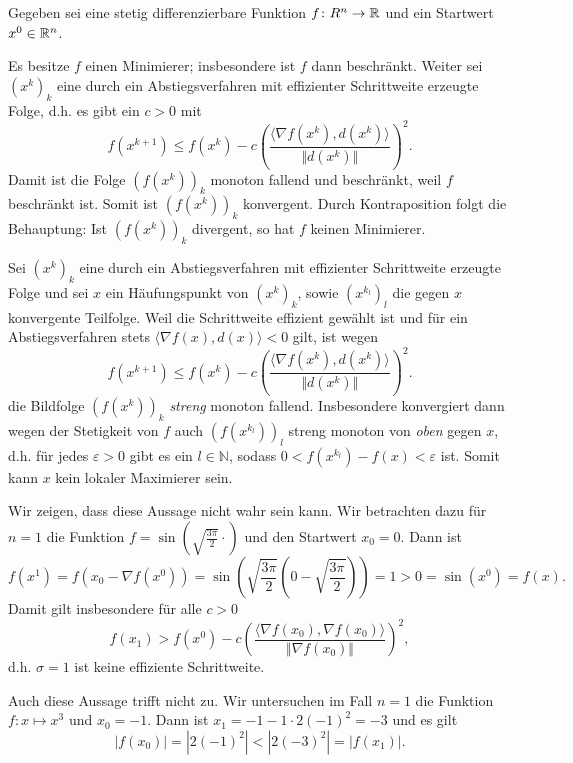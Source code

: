 
Gegeben sei eine stetig differenzierbare Funktion $f\colon R^n\to \mathbb{R}$
und ein Startwert $x^0\in\mathbb{R}^n$.\\
\begin{compactenum}[(i)]
 \item Es besitze $f$ einen Minimierer; insbesondere ist $f$ dann beschränkt. 
 Weiter sei $(x^k)_k$ eine durch ein Abstiegsverfahren mit effizienter
 Schrittweite erzeugte Folge, d.h. es gibt ein $c>0$ mit
\begin{displaymath}
 f(x^{k+1})\leq f(x^k)-c\left(\frac{\langle\nabla f(x^k),d(x^k)\rangle}{\Vert d(x^k)\Vert}\right)^2.
\end{displaymath}
 Damit ist die Folge $(f(x^k))_k$ monoton fallend und beschränkt, weil
 $f$ beschränkt ist. Somit ist $(f(x^k))_k$ konvergent. Durch Kontraposition
 folgt die Behauptung: Ist $(f(x^k))_k$ divergent, so hat $f$ keinen Minimierer.
 \\
 \item Sei $(x^k)_k$ eine durch ein Abstiegsverfahren mit effizienter Schrittweite erzeugte
 Folge und sei $x$ ein Häufungspunkt von $(x^k)_k$, sowie $(x^{k_l})_l$ die gegen $x$ konvergente
 Teilfolge. Weil die Schrittweite effizient gewählt ist und für ein Abstiegsverfahren
  stets $\langle\nabla f(x),d(x)\rangle<0$ gilt, ist wegen
 \begin{displaymath}
 f(x^{k+1})\leq f(x^k)-c\left(\frac{\langle\nabla f(x^k),d(x^k)\rangle}{\Vert d(x^k)\Vert}\right)^2.
\end{displaymath}
 die Bildfolge $(f(x^k))_k$ \textit{streng} monoton fallend. Insbesondere konvergiert dann wegen der Stetigkeit von $f$
 auch $(f(x^{k_l}))_l$ streng monoton von \textit{oben} gegen $x$, d.h. für jedes $\varepsilon >0$ gibt es ein
 $l\in\mathbb{N}$, sodass $0<f(x^{k_l})-f(x)<\varepsilon$ ist. Somit kann $x$ kein lokaler Maximierer sein.
 \\
 \item Wir zeigen, dass diese Aussage nicht wahr sein kann. Wir betrachten dazu für $n=1$
 die Funktion $f=\sin(\sqrt{\frac{3\pi}{2}}\cdot)$ und den Startwert $x_0=0$. Dann ist
 \begin{displaymath}
  f(x^1)=f(x_0-\nabla f(x^0))=\sin\left(\sqrt{\frac{3\pi}{2}}\left(0-\sqrt{\frac{3\pi}{2}}\right)\right)=1>0=\sin(x^0)=f(x).
 \end{displaymath}
 Damit gilt insbesondere für alle $c>0$
 \begin{displaymath}
 f(x_1)> f(x^0)-c\left(\frac{\langle\nabla f(x_0),\nabla f(x_0)\rangle}{\Vert \nabla f(x_0)\Vert}\right)^2,
\end{displaymath}
d.h. $\sigma=1$ ist keine effiziente Schrittweite.
\\
 \item Auch diese Aussage trifft nicht zu. Wir untersuchen im Fall $n=1$ die Funktion $f\colon x\mapsto x^3$ und $x_0=-1$.
 Dann ist $x_1=-1-1\cdot 2(-1)^2=-3$ und es gilt
 \begin{displaymath}
  |f(x_0)|=|2(-1)^2|<|2(-3)^2|=|f(x_1)|.
 \end{displaymath}

\end{compactenum}
